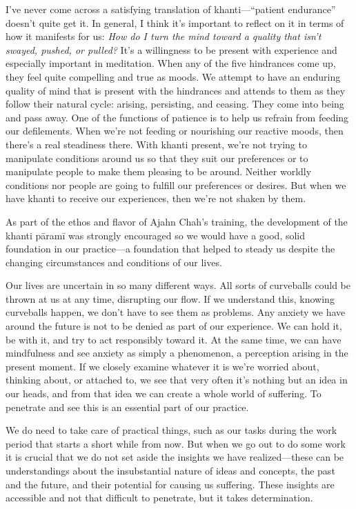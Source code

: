 I've never come across a satisfying translation of khanti---``patient 
endurance'' doesn't quite get it. In general, I think it's important to 
reflect on it in terms of how it manifests for us: \emph{How do I turn 
the mind toward a quality that isn't swayed, pushed, or pulled?} It's a 
willingness to be present with experience and especially important in 
meditation. When any of the five hindrances come up, they feel quite 
compelling and true as moods. We attempt to have an enduring quality of 
mind that is present with the hindrances and attends to them as they 
follow their natural cycle: arising, persisting, and ceasing. They come 
into being and pass away. One of the functions of patience is to help 
us refrain from feeding our defilements. When we're not feeding or 
nourishing our reactive moods, then there's a real steadiness there. 
With khanti present, we're not trying to manipulate conditions around 
us so that they suit our preferences or to manipulate people to make 
them pleasing to be around. Neither worldly conditions nor people are 
going to fulfill our preferences or desires. But when we have khanti to 
receive our experiences, then we're not shaken by them.

As part of the ethos and flavor of Ajahn Chah's training, the 
development of the khanti pāramī was strongly encouraged so we would 
have a good, solid foundation in our practice---a foundation that 
helped to steady us despite the changing circumstances and conditions 
of our lives.


Our lives are uncertain in so many different ways. All sorts of 
curveballs could be thrown at us at any time, disrupting our flow. If 
we understand this, knowing curveballs happen, we don't have to see 
them as problems. Any anxiety we have around the future is not to be 
denied as part of our experience. We can hold it, be with it, and try 
to act responsibly toward it. At the same time, we can have mindfulness 
and see anxiety as simply a phenomenon, a perception arising in the 
present moment. If we closely examine whatever it is we're worried 
about, thinking about, or attached to, we see that very often it's 
nothing but an idea in our heads, and from that idea we can create a 
whole world of suffering. To penetrate and see this is an essential 
part of our practice.

We do need to take care of practical things, such as our tasks during 
the work period that starts a short while from now. But when we go out 
to do some work it is crucial that we do not set aside the insights we 
have realized---these can be understandings about the insubstantial 
nature of ideas and concepts, the past and the future, and their 
potential for causing us suffering. These insights are accessible and 
not that difficult to penetrate, but it takes determination.

